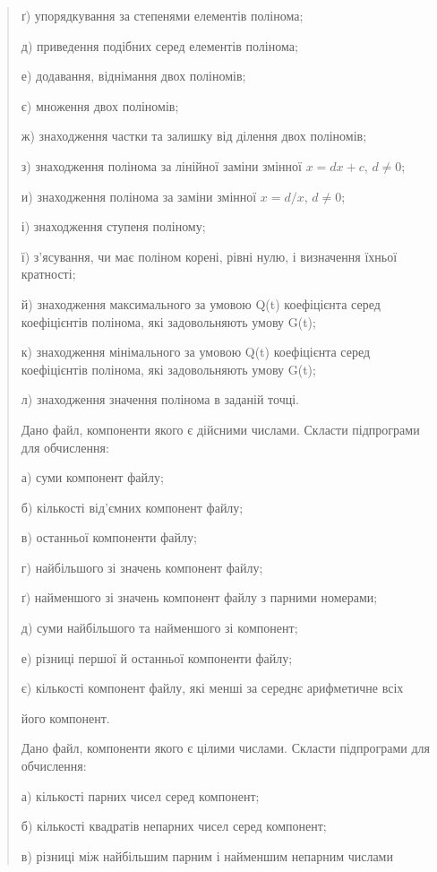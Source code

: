\documentclass[]{article}
\begin{document}
\begin{quote}
ґ) упорядкування за степенями елементів полінома;

д) приведення подібних серед елементів полінома;

е) додавання, віднімання двох поліномів;

є) множення двох поліномів;

ж) знаходження частки та залишку від ділення двох поліномів;

з) знаходження полінома за лінійної заміни змінної $x = dx + c$, $d \neq 0$;

и) знаходження полінома за заміни змінної $x = d/x$, $d \neq 0$;

і) знаходження ступеня поліному;

ї) з'ясування, чи має поліном корені, рівні нулю, і визначення їхньої
кратності;

й) знаходження максимального за умовою Q(t) коефіцієнта серед
коефіцієнтів полінома, які задовольняють умову G(t);

к) знаходження мінімального за умовою Q(t) коефіцієнта серед
коефіцієнтів полінома, які задовольняють умову G(t);

л) знаходження значення полінома в заданій точці.

\protect\hypertarget{_Hlk65238097}{}{}Дано файл, компоненти якого є
дійсними числами. Скласти підпрограми для обчислення:

а) суми компонент файлу;

б) кількості від'ємних компонент файлу;

в) останньої компоненти файлу;

г) найбільшого зі значень компонент файлу;

ґ) найменшого зі значень компонент файлу з парними номерами;

д) суми найбільшого та найменшого зі компонент;

е) різниці першої й останньої компоненти файлу;

є) кількості компонент файлу, які менші за середнє арифметичне всіх

його компонент.

\protect\hypertarget{_Hlk65237989}{}{}Дано файл, компоненти якого є
цілими числами. Скласти підпрограми для обчислення:

а) кількості парних чисел серед компонент;

б) кількості квадратів непарних чисел серед компонент;

в) різниці між найбільшим парним і найменшим непарним числами


\end{quote}
\end{document}
